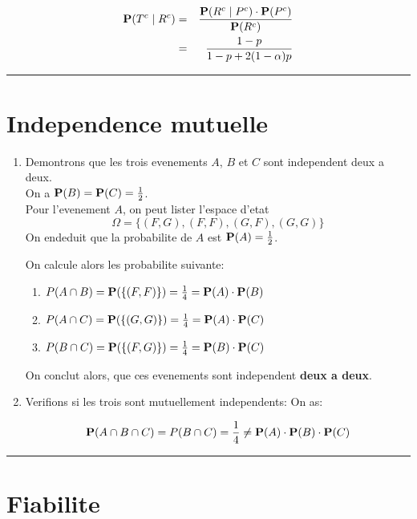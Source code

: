 \documentclass[a4paper]{tufte-handout}
\begin{document}
\begin{eqnarray*}
  \P(T^c\;|\; R^c) &=&  \frac{\P(R^c\;|\;P^c)\cdot \P(P^c)}{\P(R^c)}\\
                  & = & \frac{1-p}{1-p + 2(1-\alpha)p}
\end{eqnarray*}

\hrule

\section{Independence mutuelle}

\begin{enumerate}
  \item Demontrons que les trois evenements $A$, $B$ et $C$ sont independent
    deux a deux.\\

    On a $\P(B) = \P(C) = \frac{1}{2} $.\\

    Pour l'evenement $A$, on peut lister l'espace d'etat 
    \begin{equation*}
      \Omega=\{ (F,G), (F,F), (G,F), (G,G)\}
    \end{equation*}
    On endeduit que la probabilite de $A$ est $\P(A) = \frac{1}{2}$.

    On calcule alors les probabilite suivante:
    \begin{enumerate}
    \item $P(A\cap B) = \P(\{(F,F)\}) = \frac{1}{4} = \P(A)\cdot \P(B)$
    \item $P(A\cap C) = \P(\{(G,G)\}) = \frac{1}{4} = \P(A)\cdot \P(C)$
    \item $P(B\cap C) = \P(\{(F,G)\}) = \frac{1}{4} = \P(B)\cdot \P(C)$
    \end{enumerate}
    On conclut alors, que ces evenements sont independent \textbf{deux a deux}.
\item  Verifions si les trois sont mutuellement independents: 
  On as:

  \begin{equation*}
    \P(A\cap B\cap C)  =  P(B\cap C) = \frac{1}{4} \neq
    \P(A)\cdot\P(B)\cdot\P(C)
  \end{equation*}
\end{enumerate}

\hrule
\section{Fiabilite}
\end{document}
